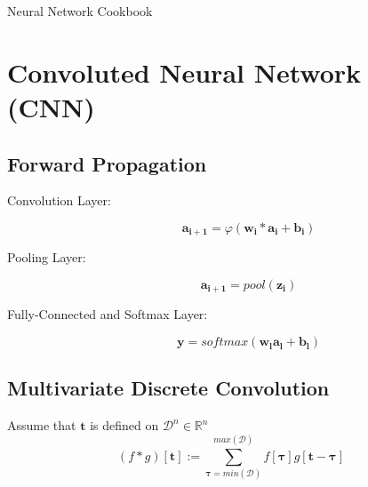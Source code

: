 \documentclass{article}
\begin{document}
Neural Network Cookbook

\section{Convoluted Neural Network (CNN)}

\subsection{Forward Propagation}
\begin{description}
    \item[Convolution Layer:]
    \begin{equation}
        \bm{a_{i+1}}=\varphi(\bm{w_i}*\bm{a_i}+\bm{b_i})    
    \end{equation}

    \item[Pooling Layer:]
    \begin{equation}
        \bm{a_{i+1}}=pool(\bm{z_i})
    \end{equation}

    \item[Fully-Connected and Softmax Layer:]
    \begin{equation}
        \bm{y}=softmax(\bm{w_l}\bm{a_l}+\bm{b_l})
    \end{equation}    
\end{description}

\subsection{Multivariate Discrete Convolution}
Assume that $\bm{t}$ is defined on $\mathcal{D}^n\in\mathbb{R}^n$
\begin{equation}
    (f*g)[\bm{t}]:=\sum^{max(\mathcal{D})}_{\bm{\tau}=min(\mathcal{D})}
    f[\bm{\tau}]g[\bm{t}-\bm{\tau}]
\end{equation}

\section{}
\end{document}
